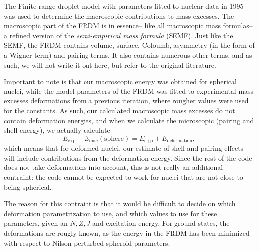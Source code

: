 The Finite-range droplet model with parameters fitted to nuclear data in 1995\cite{moller1995} was used to determine the macroscopic contributions to mass excesses. The macroscopic part of the FRDM is in essence-- like all macroscopic mass formulas-- a refined version of the \emph{semi-empirical mass formula} (SEMF). Just like the SEMF, the FRDM contains volume, surface, Coloumb, asymmetry (in the form of a Wigner term) and pairing terms. It also contains numerous other terms, and as such, we will not write it out here, but refer to the original literature\cite{moller1995}.

Important to note is that our macroscopic energy was obtained for spherical nuclei, while the model parameters of the FRDM was fitted to experimental mass excesses deformations from a previous iteration, where rougher values were used for the constants. As such, our calculated macroscopic mass excesses do not contain deformation energies, and when we calculate the microscopic (pairing and shell energy), we actually calculate
\begin{equation}
E_\text{exp} - E_\text{mac}(\text{sphere}) = E_{\text{s}+\text{p}} + E_\text{deformation},
\end{equation}
which means that for deformed nuclei, our estimate of shell and pairing effects will include contributions from the deformation energy.
Since the rest of the code does not take deformations into account, this is not really an additional contraint: the code cannot be expected to work for nuclei that are not close to being spherical. 

The reason for this contraint is that it would be difficult to decide on which deformation parametrization to use, and which values to use for these parameters, given an $N,Z, J$ and excitation energy. For ground states, the deformations are rougly known, as the energy in the FRDM has been minimized with respect to Nilson perturbed-spheroid parameters. 
